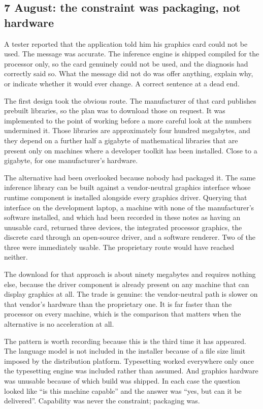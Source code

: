 \documentclass[11pt,a4paper]{article}
\begin{document}
\subsection{7 August: the constraint was packaging, not hardware}

A tester reported that the application told him his graphics card could not be
used. The message was accurate. The inference engine is shipped compiled for the
processor only, so the card genuinely could not be used, and the diagnosis had
correctly said so. What the message did not do was offer anything, explain why,
or indicate whether it would ever change. A correct sentence at a dead end.

The first design took the obvious route. The manufacturer of that card publishes
prebuilt libraries, so the plan was to download those on request. It was
implemented to the point of working before a more careful look at the numbers
undermined it. Those libraries are approximately four hundred megabytes, and
they depend on a further half a gigabyte of mathematical libraries that are
present only on machines where a developer toolkit has been installed. Close to
a gigabyte, for one manufacturer's hardware.

The alternative had been overlooked because nobody had packaged it. The same
inference library can be built against a vendor-neutral graphics interface whose
runtime component is installed alongside every graphics driver. Querying that
interface on the development laptop, a machine with none of the manufacturer's
software installed, and which had been recorded in these notes as having an
unusable card, returned three devices, the integrated processor graphics, the
discrete card through an open-source driver, and a software renderer. Two of the
three were immediately usable. The proprietary route would have reached neither.

The download for that approach is about ninety megabytes and requires nothing
else, because the driver component is already present on any machine that can
display graphics at all. The trade is genuine: the vendor-neutral path is slower
on that vendor's hardware than the proprietary one. It is far faster than the
processor on every machine, which is the comparison that matters when the
alternative is no acceleration at all.

The pattern is worth recording because this is the third time it has appeared.
The language model is not included in the installer because of a file size limit
imposed by the distribution platform. Typesetting worked everywhere only once
the typesetting engine was included rather than assumed. And graphics hardware
was unusable because of which build was shipped. In each case the question
looked like ``is this machine capable'' and the answer was ``yes, but can it be
delivered''. Capability was never the constraint; packaging was.
\end{document}
